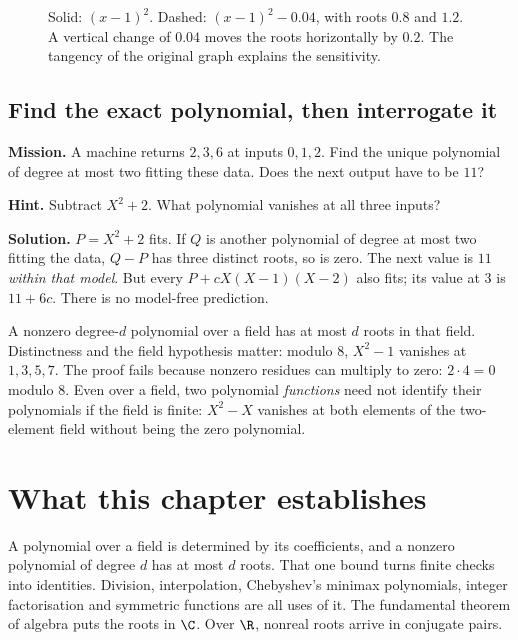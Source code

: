\begin{figure}[ht]\centering{}
\caption{Solid: $(x-1)^2$. Dashed: $(x-1)^2-0.04$, with roots $0.8$ and $1.2$. A vertical change of $0.04$ moves the roots horizontally by $0.2$. The tangency of the original graph explains the sensitivity.}\end{figure}

\subsection*{Find the exact polynomial, then interrogate it}
\textbf{Mission.} A machine returns $2,3,6$ at inputs $0,1,2$. Find the unique polynomial of degree at most two fitting these data. Does the next output have to be $11$?

\textbf{Hint.} Subtract $X^2+2$. What polynomial vanishes at all three inputs?

\textbf{Solution.} $P=X^2+2$ fits. If $Q$ is another polynomial of degree at most two fitting the data, $Q-P$ has three distinct roots, so is zero. The next value is $11$ \emph{within that model}. But every $P+cX(X-1)(X-2)$ also fits; its value at $3$ is $11+6c$. There is no model-free prediction.

\begin{reminder}
A nonzero degree-$d$ polynomial over a field has at most $d$ roots in that field. Distinctness and the field hypothesis matter: modulo $8$, $X^2-1$ vanishes at $1,3,5,7$. The proof fails because nonzero residues can multiply to zero: $2\cdot4=0$ modulo $8$. Even over a field, two polynomial \emph{functions} need not identify their polynomials if the field is finite: $X^2-X$ vanishes at both elements of the two-element field without being the zero polynomial.
\end{reminder}



\section*{What this chapter establishes}
A polynomial over a field is determined by its coefficients, and a nonzero polynomial of degree $d$ has at most $d$ roots. That one bound turns finite checks into identities. Division, interpolation, Chebyshev's minimax polynomials, integer factorisation and symmetric functions are all uses of it. The fundamental theorem of algebra puts the roots in $\C$. Over $\R$, nonreal roots arrive in conjugate pairs.

